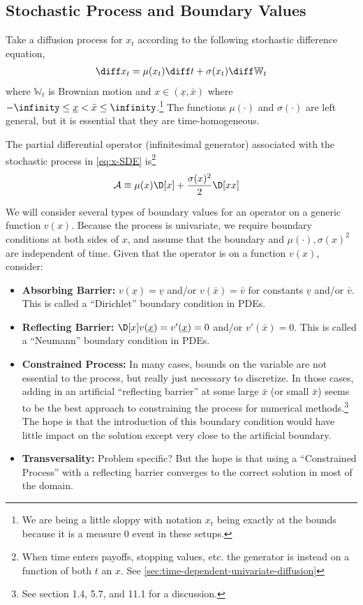 \documentclass[11pt]{etk-article}
\begin{document}
\subsection{Stochastic Process and Boundary Values}
Take a diffusion process for $x_t$ according to the following stochastic difference equation,
\begin{align}
\diff x_t = \mu(x_t)\diff t + \sigma(x_t)\diff\mathbb{W}_t\label{eq:x-SDE}
\end{align}
where $\mathbb{W}_t$ is Brownian motion and $x \in (\underline{x}, \bar{x})$ where $-\infinity \leq \underline{x} < \bar{x} \leq \infinity$.\footnote{We are being a little sloppy with notation $x_t$ being exactly at the bounds because it is a measure $0$ event in these setups.}  The functions $\mu(\cdot)$ and $\sigma(\cdot)$ are left general, but it is essential that they are time-homogeneous.

The partial differential operator (infinitesimal generator) associated with the stochastic process in \cref{eq:x-SDE} is\footnote{When time enters payoffs, stopping values, etc. the generator is instead on a function of both $t$ an $x$.  See \cref{sec:time-dependent-univariate-diffusion}}
\begin{align}
	\mathcal{A} &\equiv \mu(x)\D[x] + \frac{\sigma(x)^2}{2}\D[xx]\label{eq:A-generator-univariate-diffusion}
\end{align}

We will consider several types of boundary values for an operator on a generic function $v(x)$.  Because the process is univariate, we require boundary conditions at both sides of $x$, and assume that the boundary and $\mu(\cdot), \sigma(x)^2$ are independent of time.  Given that the operator is on a function $v(x)$, consider:
\begin{itemize}
	\item \textbf{Absorbing Barrier:}   $v(\underline{x}) = \underline{v}$ and/or $v(\bar{x}) = \bar{v}$ for constants $\underline{v}$ and/or $\bar{v}$.  This is called a ``Dirichlet'' boundary condition in PDEs. 
	\item \textbf{Reflecting Barrier:} $\D[x]v(\underline{x}) = v'(\underline{x})=0$ and/or $v'(\bar{x}) = 0$.  This is called a ``Neumann'' boundary condition in PDEs. 
	\item \textbf{Constrained Process:}  In many cases, bounds on the variable are not essential to the process, but really just necessary to discretize.  In those cases, adding in an artificial ``reflecting barrier'' at some large $\bar{x}$ (or small $\bar{x}$) seems to be the best approach to constraining the process for numerical methods.\footnote{See \cite{KushnerDupuis2001} section 1.4, 5.7, and 11.1 for a discussion.}  The hope is that the introduction of this boundary condition would have little impact on the solution except very close to the artificial boundary.
	\item \textbf{Transversality:} Problem specific?  But the hope is that using a ``Constrained Process'' with a reflecting barrier converges to the correct solution in most of the domain.
\end{itemize}
\end{document}
